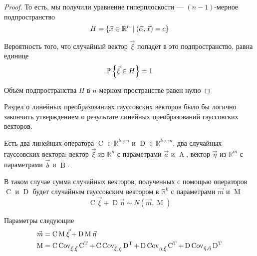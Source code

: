 \begin{proof}
  То есть, мы получили уравнение гиперплоскости ---
  $\left( n-1 \right)$-мерное подпространство
  $$H = \left\{ \vec{x} \in \mathbb{R}^n
      \;\middle|\; \left( \vec{\alpha}, \vec{x} \right) = c \right\}$$

  Вероятность того, что случайный вектор $\vec{\xi}$ попадёт в это
  подпространство, равна единице
  $$\mathbb{P}_{{}}\left\{ \vec{\xi} \in H \right\} = 1$$

  Объём подпространства $H$ в $n$-мерном пространстве равен нулю
\end{proof}

Раздел о линейных преобразованиях гауссовских векторов было бы логично закончить
утверждением о результате линейных преобразований гауссовских векторов.

\begin{affirmation}\label{affirmation:gaussianVector:linearTransformations}
  Есть два линейных оператора $\operatorname{C} \in \mathbb{R}^{k \times n}$
  и $\operatorname{D} \in \mathbb{R}^{k \times m}$,
  два случайных гауссовских вектора: вектор $\vec{\xi}$ из $\mathbb{R}^n$ с
  параметрами $\vec{a}$ и $\operatorname{A}$, вектор $\vec{\eta}$ из
  $\mathbb{R}^m$ с параметрами $\vec{b}$ и $\operatorname{B}$.

  В таком случае сумма случайных векторов, полученных с помощью операторов
  $\operatorname{C}$ и $\operatorname{D}$ будет случайным гауссовским вектором
  в $\mathbb{R}^k$ с параметрами $\vec{m}$ и $\operatorname{M}$
  $$\operatorname{C} \vec{\xi} + \operatorname{D} \vec{\eta}
      \sim N\left( \vec{m}, \operatorname{M} \right)$$

  Параметры следующие
  \begin{align*}
      \vec{m} &= \operatorname{C} \operatorname{M}_{} \vec{\xi}
      + \operatorname{D} \operatorname{M}_{} \vec{\eta} \\
      \operatorname{M} &= \operatorname{C} \operatorname{Cov^{}_{\vec{\xi}, \vec{\xi}}} \operatorname{C^T}
      + \operatorname{C} \operatorname{Cov^{}_{\vec{\xi}, \vec{\eta}}} \operatorname{D^T}
      + \operatorname{D} \operatorname{Cov^{}_{\vec{\eta}, \vec{\xi}}} \operatorname{C^T}
      + \operatorname{D} \operatorname{Cov^{}_{\vec{\eta}, \vec{\eta}}} \operatorname{D^T}
  \end{align*}
\end{affirmation}
